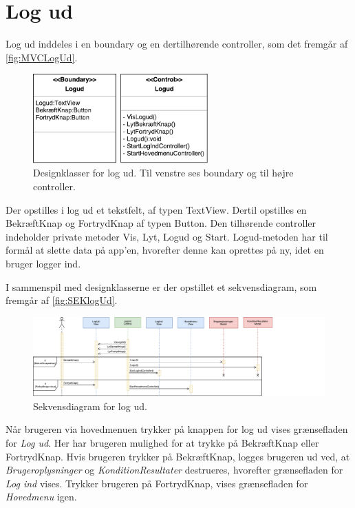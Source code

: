\section*{Log ud}
Log ud inddeles i en boundary og en dertilhørende controller, som det fremgår af \autoref{fig:MVCLogUd}. 

\begin{figure} [H]
\centering
\includegraphics[width=0.6\textwidth]{figures/MVC/Logud}
\caption{Designklasser for log ud. Til venstre ses boundary og til højre controller.}
\label{fig:MVCLogUd}
\end{figure}

\noindent
Der opstilles i log ud et tekstfelt, af typen TextView. Dertil opstilles en BekræftKnap og FortrydKnap af typen Button. 
Den tilhørende controller indeholder private metoder Vis, Lyt, Logud og Start. Logud-metoden har til formål at slette data på app'en, hvorefter denne kan oprettes på ny, idet en bruger logger ind. 

I sammenspil med designklasserne er der opstillet et sekvensdiagram, som fremgår af \autoref{fig:SEKlogUd}.

\begin{figure} [H]
\centering
\includegraphics[width=1.28\textwidth]{figures/Sek/SEKLogUd}
\caption{Sekvensdiagram for log ud.}
\label{fig:SEKlogUd}
\end{figure}

\noindent
Når brugeren via hovedmenuen trykker på knappen for log ud vises grænsefladen for \textit{Log ud}. Her har brugeren mulighed for at trykke på BekræftKnap eller FortrydKnap. Hvis brugeren trykker på BekræftKnap, logges brugeren ud ved, at \textit{Brugeroplysninger} og \textit{KonditionResultater} destrueres, hvorefter grænsefladen for \textit{Log ind} vises. Trykker brugeren på FortrydKnap, vises grænsefladen for \textit{Hovedmenu} igen. 
